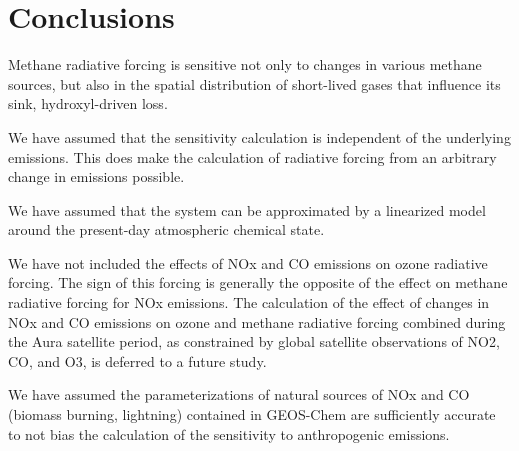 \section{Conclusions}

Methane radiative forcing is sensitive not only to changes in various methane sources, but also in the spatial distribution of short-lived gases that influence its sink, hydroxyl-driven loss.

We have assumed that the sensitivity calculation is independent of the underlying emissions. This does make the calculation of radiative forcing from an arbitrary change in emissions possible.

We have assumed that the system can be approximated by a linearized model around the present-day atmospheric chemical state.

We have not included the effects of NOx and CO emissions on ozone radiative forcing. The sign of this forcing is generally the opposite of the effect on methane radiative forcing for NOx emissions. The calculation of the effect of changes in NOx and CO emissions on ozone and methane radiative forcing combined during the Aura satellite period, as constrained by global satellite observations of NO2, CO, and O3, is deferred to a future study.

We have assumed the parameterizations of natural sources of NOx and CO (biomass burning, lightning) contained in GEOS-Chem are sufficiently accurate to not bias the calculation of the sensitivity to anthropogenic emissions.

